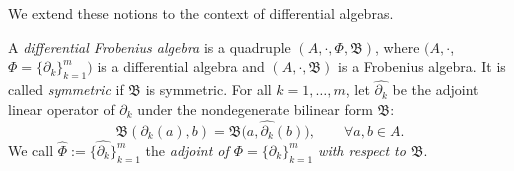 \documentclass[10pt,a4paper]{amsart}
\numberwithin{equation}{section}
\begin{document}
We extend these notions to the context of differential algebras.
\begin{Definition}\label{def:differential_Frobenius_algebra}
 A \textit{differential Frobenius algebra} is a quadruple $(A, \cdot, \Phi, \mathfrak{B})$, where $(A, \cdot$, $\Phi = \{\partial_k\}_{k=1}^m)$ is a differential algebra
 and $(A, \cdot, \mathfrak{B})$ is a Frobenius algebra. It is
 called \textit{symmetric} if $\mathfrak B$ is symmetric.
 For all $k=1,\dots, m$, let $\hat{\partial_k}$ be the adjoint linear operator of $\partial_k$ under the nondegenerate bilinear form $\mathfrak{B}$:
 \begin{equation*}
 \mathfrak{B}(\partial_k(a), b) = \mathfrak{B}\big(a, \hat{\partial_k}(b)\big), \qquad
 \forall a, b \in A.
 \end{equation*}
 We call $\hat{\Phi} := \big\{\hat{\partial_k}\big\}_{k=1}^m$ the \textit{adjoint of $\Phi = \{\partial_k\}_{k=1}^m$ with respect to $\mathfrak B$}.
\end{Definition}
\end{document}
